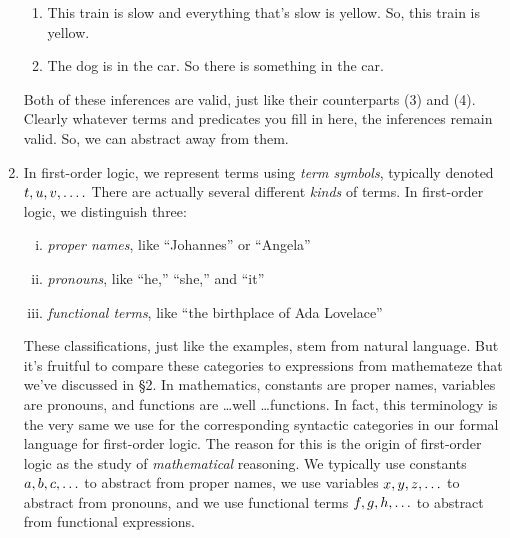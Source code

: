 \begin{enumerate}[\thesection.1]
\begin{enumerate}[(1')]
		\item This train is slow and everything that's slow is yellow. So, this train is yellow.
		
		\item The dog is in the car. So there is something in the car.
	
	\end{enumerate}
		Both of these inferences are valid, just like their counterparts (3) and (4).
		Clearly whatever  terms and predicates you fill in here, the inferences remain valid.
		So, we can abstract away from them.

		\item In first-order logic, we represent terms using \emph{term symbols}, typically denoted $t,u,v,\mathellipsis.$ There are actually several different \emph{kinds} of terms. In first-order logic, we distinguish three:
		\begin{enumerate}[(i)]
		
			\item \emph{proper names}, like ``Johannes'' or ``Angela''
			
			\item \emph{pronouns}, like ``he,'' ``she,'' and ``it''
			
			\item \emph{functional terms}, like ``the birthplace of Ada Lovelace''
		
		\end{enumerate}
These classifications, just like the examples, stem from natural language. But it's fruitful to compare these categories to expressions from mathemateze that we've discussed in \S2. In mathematics, constants are proper names, variables are pronouns, and functions are \dots well \dots functions. In fact, this terminology is the very same we use for the corresponding syntactic categories in our formal language for first-order logic. The reason for this is the origin of first-order logic as the study of \emph{mathematical} reasoning. We typically use constants $a,b,c,\mathellipsis$ to abstract from proper names, we use variables $x,y,z,\mathellipsis$ to abstract from pronouns, and we use functional terms $f,g,h,\mathellipsis$ to abstract from functional expressions.


\end{enumerate}
